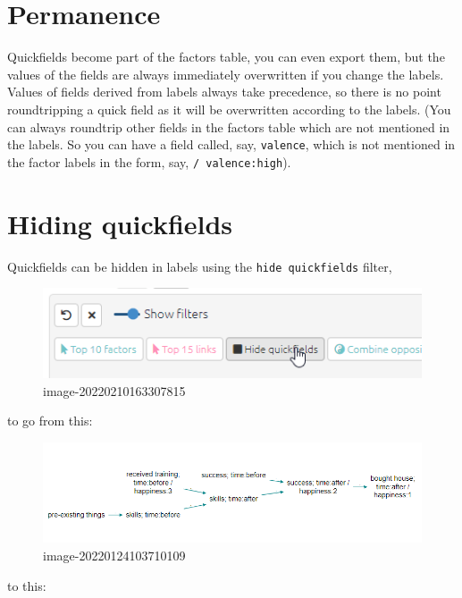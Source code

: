 \documentclass[
]{book}
\begin{document}
\hypertarget{permanence}{%
\section{Permanence}\label{permanence}}

Quickfields become part of the factors table, you can even export them, but the values of the fields are always immediately overwritten if you change the labels. Values of fields derived from labels always take precedence, so there is no point roundtripping a quick field as it will be overwritten according to the labels. (You can always roundtrip other fields in the factors table which are not mentioned in the labels. So you can have a field called, say, \texttt{valence}, which is not mentioned in the factor labels in the form, say, \texttt{/\ valence:high}).

\hypertarget{xhiding-quickfields}{%
\section{Hiding quickfields}\label{xhiding-quickfields}}

Quickfields can be hidden in labels using the \texttt{hide\ quickfields} filter,

\begin{figure}
\centering
\includegraphics{_assets/image-20220210163307815.png}
\caption{image-20220210163307815}
\end{figure}

to go from this:

\begin{figure}
\centering
\includegraphics[width=6.77083in,height=\textheight]{_assets/image-20220124103710109.png}
\caption{image-20220124103710109}
\end{figure}

to this:
\end{document}
